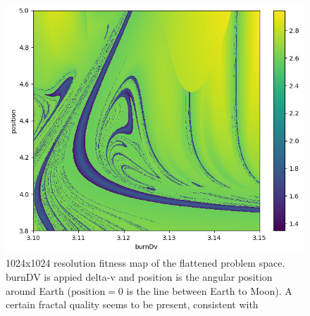 \begin{figure}[ht]
    \centering
    \includegraphics[width=\linewidth]{fig/golf_course_s1024.png}
    \caption{1024x1024 resolution fitness map of the flattened problem space. burnDV is appied delta-v and position is the angular position around Earth ($\text{position} = 0$ is the line between Earth to Moon). A certain fractal quality seems to be present, consistent with \cite{Topputo2014}}
    \label{fig:golf_course_s1024}
\end{figure}